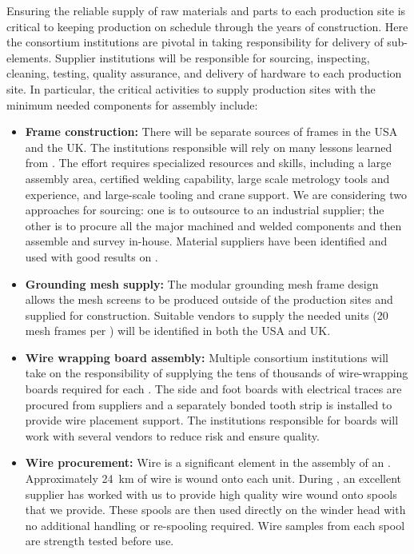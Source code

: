 Ensuring the reliable supply of raw materials and parts to each  production site is critical to keeping  production on schedule through the years of construction. Here the consortium institutions are pivotal in taking responsibility for delivery of  sub-elements. Supplier institutions will be responsible for sourcing, inspecting, cleaning, testing, quality assurance, and delivery of hardware to each production site.  In particular, the critical activities to supply production sites with the minimum needed  components for assembly include:

\begin{itemize}

\item {\bf Frame construction:} There will be separate sources of frames in the USA and the UK. The institutions responsible will rely on many lessons learned from . The effort requires specialized resources and skills, including a large assembly area, certified welding capability, large scale metrology tools and experience, and large-scale tooling and crane support. We are considering two approaches for sourcing: one is to outsource to an industrial supplier; the other is to procure all the major machined and welded components and then assemble and survey in-house. Material suppliers have been identified and used with good results on .

\item {\bf Grounding mesh supply:} The modular grounding mesh frame design allows the mesh screens to be produced outside of the  production sites and supplied for  construction.  Suitable vendors to supply the needed units (20 mesh frames per ) will be identified in both the USA and UK.   

\item {\bf Wire wrapping board assembly:} Multiple consortium institutions will take on the responsibility of supplying the tens of thousands of wire-wrapping boards required for each  . The side and foot boards with electrical traces are procured from suppliers and a separately bonded tooth strip is installed to provide wire placement support. %
The institutions responsible for boards will work with several vendors to reduce risk and ensure quality. 


\item {\bf Wire procurement:} Wire is a significant element in the assembly of an . Approximately \SI{24}{km} of wire is wound onto each unit. During , %
an excellent supplier %
has worked with us to provide high quality wire wound onto spools that we provide. These spools are then used directly on the winder head with no additional handling or re-spooling required. Wire samples from each spool are strength tested before use.


\end{itemize}
